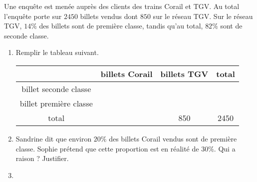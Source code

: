 
\begin{exercice}\label{exosmath-0089}

Une enquête est menée auprès des clients des trains Corail et TGV. Au total l'enquête porte sur \( 2450\) billets vendus dont \( 850\) sur le réseau TGV. Sur le réseau TGV, \( 14\%\) des billets sont de première classe, tandis qu'au total, \( 82\%\) sont de seconde classe.

\begin{enumerate}
    \item
        Remplir le tableau suivant.

\begin{center}
        \begin{tabular}[]{|c||c|c|c|}
            \hline
            &billets Corail&billets TGV& total\\
            \hline\hline
            billet seconde classe&&&\\
            \hline
            billet première classe&&&\\
            \hline
            total&&850&2450\\
            \hline
        \end{tabular}
\end{center}
\item
    Sandrine dit que environ \( 20\%\) des billets Corail vendus sont de première classe. Sophie prétend que cette proportion est en réalité de \( 30\%\). Qui a raison ? Justifier.
\item
\end{enumerate}
    


\end{exercice}
